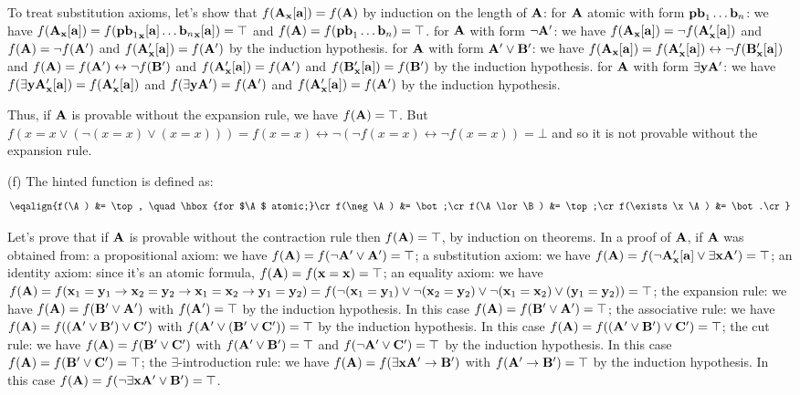 To treat substitution axioms, let's show that $f({\bf A}_{\bf x}[{\bf a}]) = f({\bf A})$ by induction on the length of ${\bf A}$:
\itemitem{$\bullet$} for ${\bf A}$ atomic with form ${\bf pb}_1 \dots {\bf b}_n$: we have $f({\bf A}_{\bf x}[{\bf a}]) = f({{\bf pb}_1}_{\bf x}[{\bf a}] \dots {{\bf b}_n}_{\bf x}[{\bf a}]) = \top$
and $f({\bf A}) = f({\bf pb}_1 \dots {\bf b}_n) = \top$.
\itemitem{$\bullet$} for ${\bf A}$ with form $\neg {\bf A}'$: we have $f({\bf A}_{\bf x}[{\bf a}]) = \neg f({\bf A}'_{\bf x}[{\bf a}])$
and $f({\bf A}) = \neg f({\bf A}')$ and $f({\bf A}'_{\bf x}[{\bf a}]) = f({\bf A}')$ by the induction hypothesis.
\itemitem{$\bullet$} for ${\bf A}$ with form ${\bf A}' \lor {\bf B}'$: we have $f({\bf A}_{\bf x}[{\bf a}]) = f({\bf A}'_{\bf x}[{\bf a}]) \leftrightarrow \neg f({\bf B}'_{\bf x}[{\bf a}])$
and $f({\bf A}) = f({\bf A}') \leftrightarrow \neg f({\bf B}')$ and $f({\bf A}'_{\bf x}[{\bf a}]) = f({\bf A}')$ and
$f({\bf B}'_{\bf x}[{\bf a}]) = f({\bf B}')$ by the induction hypothesis.
\itemitem{$\bullet$} for ${\bf A}$ with form $\exists {\bf y}{\bf A}'$: we have $f(\exists {\bf y}{\bf A}'_{\bf x}[{\bf a}]) = f({\bf A}'_{\bf x}[{\bf a}])$
and $f(\exists {\bf y}{\bf A}') = f({\bf A}')$ and $f({\bf A}'_{\bf x}[{\bf a}]) = f({\bf A}')$ by the induction hypothesis.

Thus, if ${\bf A}$ is provable without the expansion rule, we have $f({\bf A}) = \top$. 
But $f(x=x \lor (\neg (x=x) \lor (x=x))) = f(x=x) \leftrightarrow \neg (\neg f(x=x) \leftrightarrow \neg f(x=x)) = \bot$ and so it is not provable without the expansion rule.
\smallskip

\ansitem (f)
The hinted function is defined as:
$$\eqalign{f(\A) &= \top, \quad \hbox{for $\A$ atomic;}\cr
f(\neg \A) &= \bot;\cr
f(\A \lor \B) &= \top;\cr
f(\exists \x\A) &= \bot.\cr}$$

Let's prove that if ${\bf A}$ is provable without the contraction rule then $f({\bf A}) = \top$, by induction on theorems.
In a proof of ${\bf A}$, if ${\bf A}$ was obtained from:
\itemitem{$\bullet$} a propositional axiom: we have $f({\bf A}) = f(\neg {\bf A}' \lor {\bf A}') = \top$;
\itemitem{$\bullet$} a substitution axiom: we have 
$f({\bf A}) = f(\neg {\bf A}'_{\bf x}[{\bf a}] \lor \exists {\bf x}{\bf A}') = \top$;
\itemitem{$\bullet$} an identity axiom: since it's an atomic formula, $f({\bf A}) = f({\bf x} = {\bf x}) = \top$;
\itemitem{$\bullet$} an equality axiom: we have $f({\bf A}) = 
f({\bf x}_1 = {\bf y}_1 \to {\bf x}_2 = {\bf y}_2 \to {\bf x}_1 = {\bf x}_2 \to {\bf y}_1 = {\bf y}_2) =
f(\neg ({\bf x}_1 = {\bf y}_1) \lor \neg ({\bf x}_2 = {\bf y}_2) \lor \neg ({\bf x}_1 = {\bf x}_2) \lor ({\bf y}_1 = {\bf y}_2)) = \top$;
\itemitem{$\bullet$} the expansion rule: we have $f({\bf A}) = f({\bf B}' \lor {\bf A}')$ with $f({\bf A}') = \top$ by the induction hypothesis.
In this case $f({\bf A}) = f({\bf B}' \lor {\bf A}') = \top$;
\itemitem{$\bullet$} the associative rule: we have $f({\bf A}) = f(({\bf A}' \lor {\bf B}') \lor {\bf C}')$ with $f({\bf A}' \lor ({\bf B}' \lor {\bf C}')) = \top$ by the induction hypothesis.
In this case $f({\bf A}) = f(({\bf A}' \lor {\bf B}') \lor {\bf C}') = \top$;
\itemitem{$\bullet$} the cut rule: we have $f({\bf A}) = f({\bf B}' \lor {\bf C}')$ with $f({\bf A}' \lor {\bf B}') = \top$ and $f(\neg {\bf A}' \lor {\bf C}') = \top$ by the induction hypothesis.
In this case $f({\bf A}) = f({\bf B}' \lor {\bf C}') = \top$;
\itemitem{$\bullet$} the $\exists$-introduction rule: we have $f({\bf A}) = f(\exists {\bf x}{\bf A}' \to {\bf B}')$ with $f({\bf A}' \to {\bf B}') = \top$ by the induction hypothesis.
In this case $f({\bf A}) = f(\neg \exists {\bf x}{\bf A}' \lor {\bf B}') = \top$.

